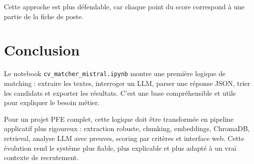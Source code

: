 \documentclass[12pt,a4paper]{article}
\begin{document}
Cette approche est plus défendable, car chaque point du score correspond à une partie de la fiche de poste.

\section{Conclusion}

Le notebook \texttt{cv\_matcher\_mistral.ipynb} montre une première logique de matching : extraire les textes, interroger un LLM, parser une réponse JSON, trier les candidats et exporter les résultats. C'est une base compréhensible et utile pour expliquer le besoin métier.

Pour un projet PFE complet, cette logique doit être transformée en pipeline applicatif plus rigoureux : extraction robuste, chunking, embeddings, ChromaDB, retrieval, analyse LLM avec preuves, scoring par critères et interface web. Cette évolution rend le système plus fiable, plus explicable et plus adapté à un vrai contexte de recrutement.
\end{document}
